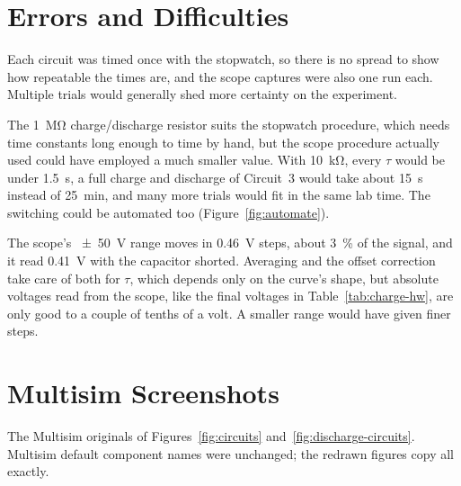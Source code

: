 \documentclass[offwhitecover]{lennylab}
\begin{document}
\section*{Errors and Difficulties}

Each circuit was timed once with the stopwatch, so there is no spread to show how repeatable the times are, and the scope captures were also one run each. Multiple trials would generally shed more certainty on the experiment.

\begin{marginfigure}[-1.2in]
  
  \caption{Automating the switch. A function generator's square wave drives relay K1, whose contacts take S1's place. The capacitor charges from the \qty{15}{\volt} supply through R, then discharges to ground through the same R. One scope trace containing many trials can be analyzed after measurement.}
  \label{fig:automate}
\end{marginfigure}%
The \qty{1}{\mega\ohm} charge/discharge resistor suits the stopwatch procedure, which needs time constants long enough to time by hand, but the scope procedure actually used could have employed a much smaller value. With \qty{10}{\kilo\ohm}, every $\tau$ would be under \qty{1.5}{\second}, a full charge and discharge of Circuit~3 would take about \qty{15}{\second} instead of \qty{25}{\minute}, and many more trials would fit in the same lab time. The switching could be automated too (Figure~\ref{fig:automate}).

The scope's \qty{\pm 50}{\volt} range moves in \qty{0.46}{\volt} steps, about \qty{3}{\percent} of the signal, and it read \qty{0.41}{\volt} with the capacitor shorted. Averaging and the offset correction take care of both for $\tau$, which depends only on the curve's shape, but absolute voltages read from the scope, like the final voltages in Table~\ref{tab:charge-hw}, are only good to a couple of tenths of a volt. A smaller range would have given finer steps.

\clearpage
\section*{Multisim Screenshots}

The Multisim originals of Figures~\ref{fig:circuits} and~\ref{fig:discharge-circuits}. Multisim default component names were unchanged; the redrawn figures copy all exactly.


\end{document}
